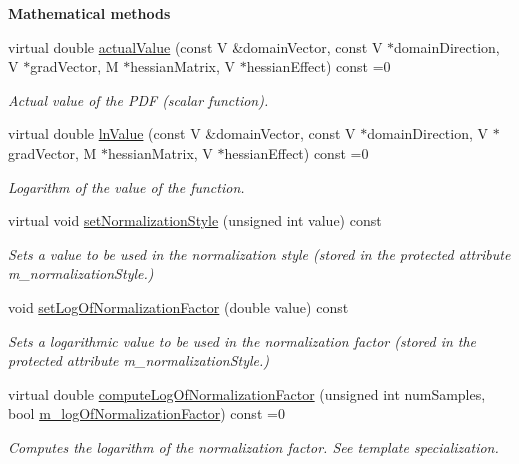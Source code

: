 \begin{Indent}{\bf Mathematical methods}\par
\begin{DoxyCompactItemize}
\item 
virtual double \hyperlink{class_q_u_e_s_o_1_1_base_joint_pdf_a3c367a0cc3fb707a136c5df47dd414c1}{actual\-Value} (const V \&domain\-Vector, const V $\ast$domain\-Direction, V $\ast$grad\-Vector, M $\ast$hessian\-Matrix, V $\ast$hessian\-Effect) const =0
\begin{DoxyCompactList}\small\item\em Actual value of the P\-D\-F (scalar function). \end{DoxyCompactList}\item 
virtual double \hyperlink{class_q_u_e_s_o_1_1_base_joint_pdf_aaeb1d91fd791399a502f451b07bb1bfe}{ln\-Value} (const V \&domain\-Vector, const V $\ast$domain\-Direction, V $\ast$grad\-Vector, M $\ast$hessian\-Matrix, V $\ast$hessian\-Effect) const =0
\begin{DoxyCompactList}\small\item\em Logarithm of the value of the function. \end{DoxyCompactList}\item 
virtual void \hyperlink{class_q_u_e_s_o_1_1_base_joint_pdf_ab11f1d096f82cc7857cefe1b92f6b28e}{set\-Normalization\-Style} (unsigned int value) const 
\begin{DoxyCompactList}\small\item\em Sets a value to be used in the normalization style (stored in the protected attribute m\-\_\-normalization\-Style.) \end{DoxyCompactList}\item 
void \hyperlink{class_q_u_e_s_o_1_1_base_joint_pdf_a2903b3f031e68907fe7422fedc83e5dc}{set\-Log\-Of\-Normalization\-Factor} (double value) const 
\begin{DoxyCompactList}\small\item\em Sets a logarithmic value to be used in the normalization factor (stored in the protected attribute m\-\_\-normalization\-Style.) \end{DoxyCompactList}\item 
virtual double \hyperlink{class_q_u_e_s_o_1_1_base_joint_pdf_a99d8ab490b093abffd6068b6ea5263bb}{compute\-Log\-Of\-Normalization\-Factor} (unsigned int num\-Samples, bool \hyperlink{class_q_u_e_s_o_1_1_base_joint_pdf_ae82d4191f17af8c7a26226d127bc7850}{m\-\_\-log\-Of\-Normalization\-Factor}) const =0
\begin{DoxyCompactList}\small\item\em Computes the logarithm of the normalization factor. See template specialization. \end{DoxyCompactList}\end{DoxyCompactItemize}
\end{Indent}
